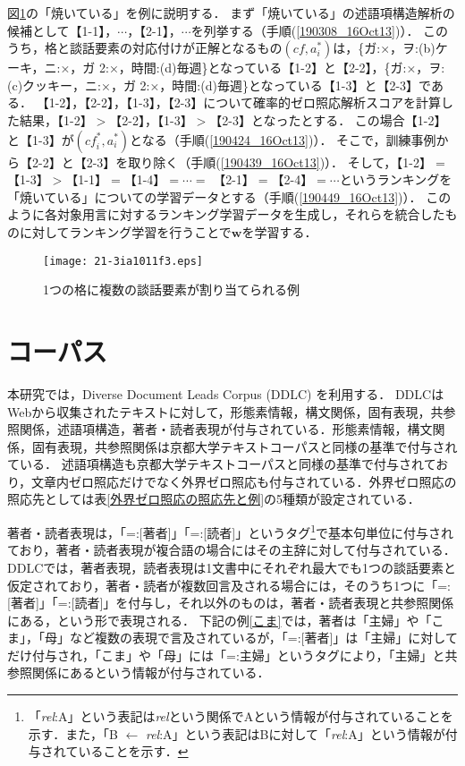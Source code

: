 \documentclass[japanese]{jnlp_1.4}
\begin{document}
図\ref{述語項構造の候補の例(2)}の「焼いている」を例に説明する．
まず「焼いている」の述語項構造解析の候補として【1-1】，$\cdots$，【2-1】，$\cdots$を列挙する（手順(\ref{190308_16Oct13})）．
このうち，格と談話要素の対応付けが正解となるもの$(\mathit{cf}, a^*_{i})$は，\{ガ:×，ヲ:(b)ケーキ，ニ:×，ガ 2:×，時間:(d)毎週\}となっている【1-2】と【2-2】，\{ガ:×，ヲ:(c)クッキー，ニ:×，ガ 2:×，時間:(d)毎週\}となっている【1-3】と【2-3】である．
【1-2】，【2-2】，【1-3】，【2-3】について確率的ゼロ照応解析スコアを計算した結果，【1-2】$>$【2-2】，【1-3】$>$【2-3】となったとする．
この場合【1-2】と【1-3】が$(\mathit{cf}^*_{i}, a^*_{i})$となる（手順(\ref{190424_16Oct13})）．
そこで，訓練事例から【2-2】と【2-3】を取り除く（手順(\ref{190439_16Oct13})）．
そして，【1-2】$=$【1-3】$>$【1-1】$=$【1-4】$= \cdots=$ 【2-1】$=$【2-4】$= \cdots$というランキングを「焼いている」についての学習データとする（手順(\ref{190449_16Oct13})）．
このように各対象用言に対するランキング学習データを生成し，それらを統合したものに対してランキング学習を行うことで$\mathbf{w}$を学習する．

\begin{figure}[t]
\texttt{[image: 21-3ia1011f3.eps]}
\caption{1つの格に複数の談話要素が割り当てられる例}
\label{述語項構造の候補の例(2)}
\vspace{-1\Cvs}
\end{figure} 


\section{コーパス}
\label{130555_9May13}

本研究では，Diverse Document Leads Corpus (DDLC) \cite{hangyo-kawahara-kurohashi:2012:PACLIC}を利用する．
DDLCはWebから収集されたテキストに対して，形態素情報，構文関係，固有表現，共参照関係，述語項構造，著者・読者表現が付与されている．形態素情報，構文関係，固有表現，共参照関係は京都大学テキストコーパス\cite{KTC}と同様の基準で付与されている．
述語項構造も京都大学テキストコーパスと同様の基準で付与されており，文章内ゼロ照応だけでなく外界ゼロ照応も付与されている．外界ゼロ照応の照応先としては表\ref{外界ゼロ照応の照応先と例}の5種類が設定されている．

著者・読者表現は，「=:[著者]」「=:[読者]」というタグ\footnote{「{\it rel}:A」という表記は{\it rel}という関係でAという情報が付与されていることを示す．また，「B $\leftarrow$ {\it rel}:A」という表記はBに対して「{\it rel}:A」という情報が付与されていることを示す．}で基本句単位に付与されており，著者・読者表現が複合語の場合にはその主辞に対して付与されている．
DDLCでは，著者表現，読者表現は1文書中にそれぞれ最大でも1つの談話要素と仮定されており，著者・読者が複数回言及される場合には，そのうち1つに「=:[著者]」「=:[読者]」を付与し，それ以外のものは，著者・読者表現と共参照関係にある，という形で表現される．
下記の例\ref{こま}では，著者は「主婦」や「こま」，「母」など複数の表現で言及されているが，「=:[著者]」は「主婦」に対してだけ付与され，「こま」や「母」には「=:主婦」というタグにより，「主婦」と共参照関係にあるという情報が付与されている．
\end{document}
